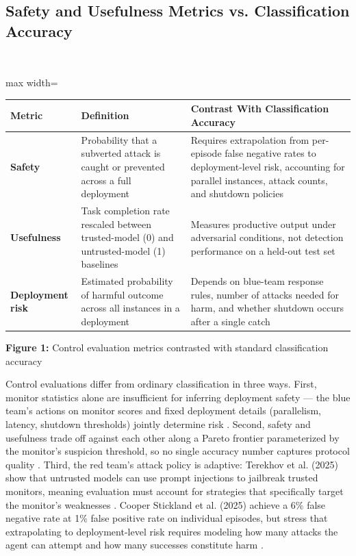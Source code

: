 \subsection*{Safety and Usefulness Metrics vs. Classification Accuracy}


\mbox{}\\
\begin{adjustbox}{max width=\textwidth}
\begin{tabular}{p{5.3cm} | p{5.3cm} | p{5.3cm}}
\hline
Metric & Definition & Contrast With Classification Accuracy \\
\hline
\textbf{Safety} & Probability that a subverted attack is caught or prevented across a full deployment  \cite{Greenblatt2023AI} & Requires extrapolation from per-episode false negative rates to deployment-level risk, accounting for parallel instances, attack counts, and shutdown policies  \cite{Stickland2025Async} \\
\textbf{Usefulness} & Task completion rate rescaled between trusted-model (0) and untrusted-model (1) baselines  \cite{Sreevatsa2026Basic} & Measures productive output under adversarial conditions, not detection performance on a held-out test set \\
\textbf{Deployment risk} & Estimated probability of harmful outcome across all instances in a deployment  \cite{Stickland2025Async} & Depends on blue-team response rules, number of attacks needed for harm, and whether shutdown occurs after a single catch  \cite{Stickland2025Async} \\
\hline
\end{tabular}
\end{adjustbox}


\textbf{Figure 1:} Control evaluation metrics contrasted with standard classification accuracy


Control evaluations differ from ordinary classification in three ways. First, monitor statistics alone are insufficient for inferring deployment safety — the blue team's actions on monitor scores and fixed deployment details (parallelism, latency, shutdown thresholds) jointly determine risk  \cite{Stickland2025Async}. Second, safety and usefulness trade off against each other along a Pareto frontier parameterized by the monitor's suspicion threshold, so no single accuracy number captures protocol quality  \cite{Sreevatsa2026Basic}. Third, the red team's attack policy is adaptive: Terekhov et al. (2025) show that untrusted models can use prompt injections to jailbreak trusted monitors, meaning evaluation must account for strategies that specifically target the monitor's weaknesses  \cite{Sreevatsa2026Basic}. Cooper Stickland et al. (2025) achieve a 6\% false negative rate at 1\% false positive rate on individual episodes, but stress that extrapolating to deployment-level risk requires modeling how many attacks the agent can attempt and how many successes constitute harm  \cite{Stickland2025Async}.


